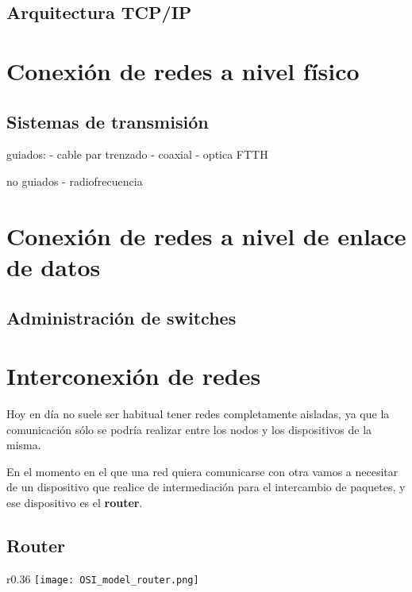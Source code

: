 \section{Arquitectura TCP/IP}





\chapter{Conexión de redes a nivel físico}



\hypertarget{sistemas_transmision}{}
\section{Sistemas de transmisión}

guiados:
- cable par trenzado
- coaxial
- optica
FTTH

no guiados
- radiofrecuencia



\chapter{Conexión de redes a nivel de enlace de datos}


\section{Administración de switches}



\chapter{Interconexión de redes}
Hoy en día no suele ser habitual tener redes completamente aisladas, ya que la comunicación sólo se podría realizar entre los nodos y los dispositivos de la misma.

En el momento en el que una red quiera comunicarse con otra vamos a necesitar de un dispositivo que realice de intermediación para el intercambio de paquetes, y ese dispositivo es el \textbf{router}.

\section{Router}

\begin{wrapfigure}{r}{0.36\linewidth}
    \centering
    \vspace{-20pt}
    \texttt{[image: OSI\_model\_router.png]}
    \vspace{-32pt}
    \vspace{-10pt}
\end{wrapfigure}

